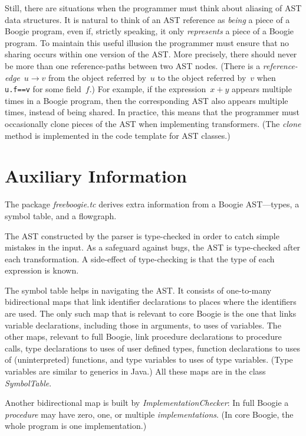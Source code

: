 \documentclass{llncs}
\newcommand{\jmlCode}{\lstinline[style=jml,basicstyle=\normalsize]}
\begin{document}
Still, there are situations when the programmer must think about
aliasing of AST data structures. It is natural to think of an
AST reference as \emph{being} a piece of a Boogie program,
even if, strictly speaking, it only \emph{represents} a piece
of a Boogie program. To maintain this useful illusion the
programmer must ensure that no sharing occurs within one version
of the AST\null. More precisely, there should never be more
than one reference-paths between two AST nodes. (There is a
\emph{reference-edge}~$u\to v$ from the object referred by~$u$
to the object referred by~$v$ when \jmlCode|u.f==v| for some
field~$f$.) For example, if the expression~$x+y$ appears multiple
times in a Boogie program, then the corresponding AST also
appears multiple times, instead of being shared. In practice,
this means that the programmer must occasionally clone pieces
of the AST when implementing transformers. (The \textit{clone}
method is implemented in the code template for AST classes.)

\section{Auxiliary Information}

The package \textit{freeboogie.tc} derives extra information from
a Boogie AST---types, a symbol table, and a flowgraph.

The AST constructed by the parser is type-checked in order to
catch simple mistakes in the input. As a safeguard against bugs,
the AST is type-checked after each transformation. A side-effect
of type-checking is that the type of each expression is known.

The symbol table helps in navigating the AST\null. It consists of
one-to-many bidirectional maps that link identifier declarations
to places where the identifiers are used. The only such
map that is relevant to core Boogie is the one that links
variable declarations, including those in arguments, to uses
of variables. The other maps, relevant to full Boogie, link
procedure declarations to procedure calls, type declarations to
uses of user defined types, function declarations to uses of
(uninterpreted) functions, and type variables to uses of type
variables. (Type variables are similar to generics in Java.) All
these maps are in the class \textit{SymbolTable}.

Another bidirectional map is built by
\textit{ImplementationChecker}: In full Boogie a \emph{procedure}
may have zero, one, or multiple \emph{implementations}. (In core
Boogie, the whole program is one implementation.)
\end{document}
